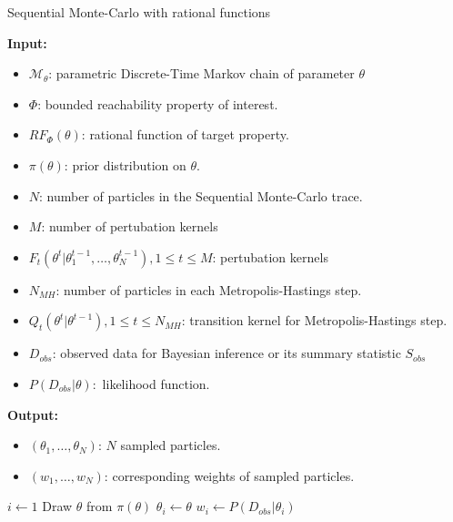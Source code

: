 \begin{algorithm}[H]
    \caption{Sequential Monte-Carlo with rational functions}
    \label{rf-smc-alg}
    \hspace*{\algorithmicindent} \textbf{Input:}
    \begin{itemize}
        \item $\mathcal{M}_\theta$: parametric Discrete-Time Markov chain of parameter $\theta$
        \item $\Phi$: bounded reachability property of interest.
        \item $RF_\Phi(\theta)$: rational function of target property.
        \item $\pi(\theta)$: prior distribution on $\theta$.
        \item $N$: number of particles in the Sequential Monte-Carlo trace.
        \item $M$: number of pertubation kernels
        \item $F_t(\theta^t | \theta^{t-1}_1,\ldots,\theta^{t-1}_N), 1\leq t \leq M$: pertubation kernels
        \item $N_{MH}$: number of particles in each Metropolis-Hastings step.
        \item $Q_t(\theta^t|\theta^{t-1}), 1 \leq t \leq N_{MH}$: transition kernel for Metropolis-Hastings step.
        \item $D_{obs}$: observed data for Bayesian inference or its summary statistic $S_{obs}$
        \item $P(D_{obs}|\theta):$ likelihood function.
    \end{itemize}
    \hspace*{\algorithmicindent} \textbf{Output:}
    \begin{itemize}
        \item $(\theta_1,\ldots,\theta_N)$: $N$ sampled particles.
        \item $(w_1,\ldots,w_N)$: corresponding weights of sampled particles.
    \end{itemize}
    \begin{algorithmic}[1]
        \State $i \leftarrow 1$
         
            \State Draw $\theta$ from $\pi(\theta)$
            \State $\theta_i \leftarrow \theta$
            \State $w_i \leftarrow P(D_{obs}|\theta_i)$
        \EndWhile
\end{algorithmic}
\end{algorithm}

